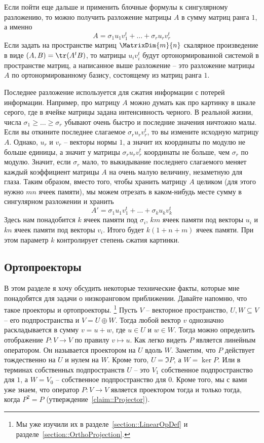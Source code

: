 Если пойти еще дальше и применить блочные формулы к сингулярному разложению, то можно получить разложение матрицы $A$ в сумму матриц ранга $1$, а именно
\[
A = \sigma_1 u_1 v_1^t + \ldots + \sigma_r u_r v_r^t
\]
Если задать на пространстве матриц $\MatrixDim{m}{n}$ скалярное произведение в виде $(A, B) = \tr(A^t B)$, то матрицы $u_iv_i^t$ будут ортонормированной системой в пространстве матриц, а написанное выше разложение -- это разложение матрицы $A$ по ортонормированному базису, состоящему из матриц ранга $1$.

Последнее разложение используется для сжатия информации с потерей информации.
Например, про матрицу $A$ можно думать как про картинку в шкале серого, где в ячейке матрицы задана интенсивность черного.
В реальной жизни, числа $\sigma_1\geqslant \ldots \geqslant \sigma_r$ убывают очень быстро и последние значения ничтожно малы.
Если вы откините последнее слагаемое $\sigma_ru_rv_r^t$, то вы измените исходную матрицу $A$.
Однако, $u_r$ и $v_r$ -- векторы нормы $1$, а значит их координаты по модулю не больше единицы, а значит у матрицы $\sigma_r u_rv_r^t$ координаты не больше, чем $\sigma_r$ по модулю.
Значит, если $\sigma_r$  мало, то выкидывание последнего слагаемого меняет каждый коэффициент матрицы $A$ на очень малую величину, незаметную для глаза.
Таким образом, вместо того, чтобы хранить матрицу $A$ целиком (для этого нужно $mn$ ячеек памяти), мы можем отрезать в каком-нибудь месте сумму в сингулярном разложении и хранить
\[
A' = \sigma_1 u_1 v_1^t + \ldots + \sigma_k u_k v_k^t
\]
Здесь нам понадобится $k$ ячеек памяти под $\sigma_i$, $km$ ячеек памяти под векторы $u_i$ и $kn$ ячеек памяти под векторы $v_i$.
Итого будет $k(1 + n + m)$ ячеек памяти.
При этом параметр $k$ контролирует степень сжатия картинки.

\subsection{Ортопроекторы}

В этом разделе я хочу обсудить некоторые технические факты, которые мне понадобятся для задачи о низкоранговом приближении.
Давайте напомню, что такое проекторы и ортопроекторы.%
\footnote{Мы уже изучили их в разделе~\ref{section::LinearOpDef} и разделе~\ref{section::OrthoProjection}.}
Пусть $V$ -- векторное пространство, $U, W\subseteq V$ -- его подпространства и $V = U \oplus W$.
Тогда любой вектор $ v$ однозначно раскладывается в сумму $v = u + w$, где $u\in U$ и $w\in W$.
Тогда можно определить отображение $P\colon V\to V$ по правилу $v\mapsto u$.
Как легко видеть $P$ является линейным оператором.
Он называется проектором на $U$ вдоль $W$.
Заметим, что $P$ действует тождественно на $U$ и нулем на $W$.
Кроме того, $U = \Im P$, а $W = \ker P$.
Или в терминах собственных подпространств $U$ -- это $V_1$ собственное подпространство для $1$, а $W = V_0$ -- собственное подпространство для $0$.
Кроме того, мы с вами уже знаем, что оператор $P\colon V\to V$ является проектором тогда и только тогда, когда $P^2 = P$ (утверждение~\ref{claim::Projector}).

